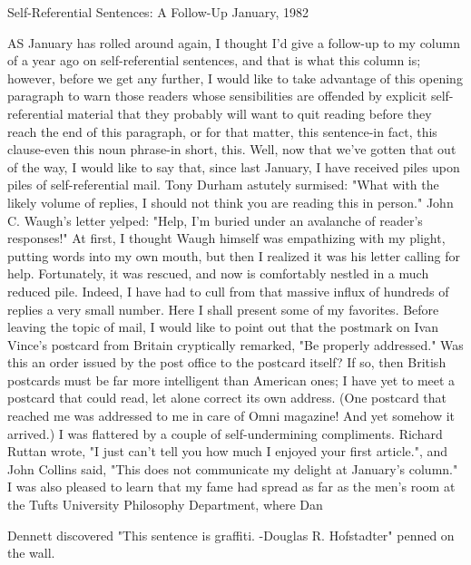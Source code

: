 Self-Referential Sentences: A Follow-Up 
January, 1982 


AS January has rolled around again, I thought I'd give a follow-up to my column of a year ago on self-referential sentences, and that is what this column is; however, before we get any further, I would like to take advantage of this opening paragraph to warn those readers whose sensibilities are offended by explicit self-referential material that they probably will want to quit reading before they reach the end of this paragraph, or for that matter, this sentence-in fact, this clause-even this noun phrase-in short, this. Well, now that we've gotten that out of the way, I would like to say that, since last January, I have received piles upon piles of self-referential mail. Tony Durham astutely surmised: "What with the likely volume of replies, I should not think you are reading this in person." John C. Waugh's letter yelped: "Help, I'm buried under an avalanche of reader's responses!" At first, I thought Waugh himself was empathizing with my plight, putting words into my own mouth, but then I realized it was his letter calling for help. Fortunately, it was rescued, and now is comfortably nestled in a much reduced pile. Indeed, I have had to cull from that massive influx of hundreds of replies a very small number. Here I shall present some of my favorites. Before leaving the topic of mail, I would like to point out that the postmark on Ivan Vince's postcard from Britain cryptically remarked, "Be properly addressed." Was this an order issued by the post office to the postcard itself? If so, then British postcards must be far more intelligent than American ones; I have yet to meet a postcard that could read, let alone correct its own address. (One postcard that reached me was addressed to me in care of Omni magazine! And yet somehow it arrived.) I was flattered by a couple of self-undermining compliments. Richard Ruttan wrote, "I just can't tell you how much I enjoyed your first article.", and John Collins said, "This does not communicate my delight at January's column." I was also pleased to learn that my fame had spread as far as the men's room at the Tufts University Philosophy Department, where Dan 



Dennett discovered "This sentence is graffiti. -Douglas R. Hofstadter" penned on the wall. 
\separator

